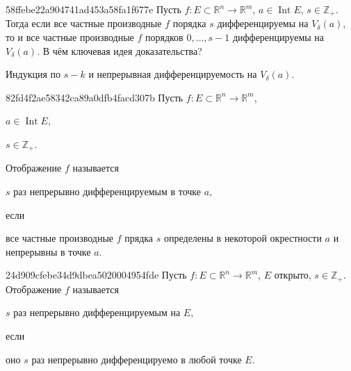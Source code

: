 \begin{note}{58ffebe22a904741ad453a58fa1f677e}
    Пусть \({ f : E \subset \mathbb R^{n} \to \mathbb R^{m} }\),\: \({ a \in \operatorname{Int} E }\),\: \({ s \in \mathbb Z_+ }\).
    Тогда если все частные производные \({ f }\) порядка \({ s }\) дифференцируемы на \({ V_\delta(a) }\), то
    и все частные производные \({ f }\) порядков \({ 0, \ldots, s - 1 }\) дифференцируемы на \({ V_\delta(a) }\).
    В чём ключевая идея доказательства?

    \begin{cloze}{1}
        Индукция по \({ s - k }\) и непрерывная дифференцируемость на \({ V_\delta(a) }\).
    \end{cloze}
\end{note}

\begin{note}{82fd4f2ae58342ca89a0dfb4facd307b}
    Пусть \({  f : E \subset \mathbb R^{n} \to \mathbb R^{m} }\),\: \begin{icloze}{4}\({ a \in \operatorname{Int} E }\),\end{icloze}\: \begin{icloze}{3}\({ s \in \mathbb Z_+ }\).\end{icloze}
    Отображение \({ f }\) называется \begin{icloze}{2}\({ s }\) раз непрерывно дифференцируемым в точке \({ a }\),\end{icloze} если
    \begin{icloze}{1}
        все частные производные \({ f }\) прядка \({ s }\) определены в некоторой окрестности \({ a }\) и непрерывны в точке \({ a }\).
    \end{icloze}
\end{note}

\begin{note}{24d909cfebe34d9dbea5020004954fde}
    Пусть \({  f : E \subset \mathbb R^{n} \to \mathbb R^{m} }\),\: \({ E }\) открыто,\: \({ s \in \mathbb Z_+ }\).
    Отображение \({ f }\) называется \begin{icloze}{2}\({ s }\) раз непрерывно дифференцируемым на \({ E }\),\end{icloze} если \begin{icloze}{1}оно \({ s }\) раз непрерывно дифференцируемо в любой точке \({ E }\).\end{icloze}
\end{note}

